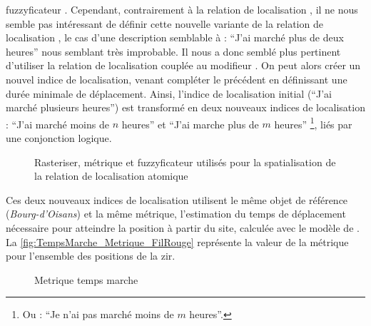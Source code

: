 fuzzyficateur . Cependant, contrairement à la
relation de localisation , il ne
nous semble pas intéressant de définir cette nouvelle variante de la
relation de localisation , le cas
d'une description semblable à : \enquote{J'ai marché plus de deux
  heures} nous semblant très improbable. Il nous a donc semblé plus
pertinent d'utiliser la relation de localisation
 couplée au modifieur
. On peut alors créer un nouvel indice de
localisation, venant compléter le précédent en définissant une durée
minimale de déplacement. Ainsi, l'indice de localisation initial
(\enquote{J'ai marché plusieurs heures}) est transformé en deux
nouveaux indices de localisation : \enquote{J'ai marché moins de \(n\)
  heures} et \enquote{J'ai marche plus de \(m\) heures} \footnote{Ou :
  \enquote{Je n'ai pas marché moins de \(m\) heures}.}, liés par une
conjonction logique.

\begin{figure}
  \centering
  
  \caption{Rasteriser, métrique et fuzzyficateur utilisés pour la
    spatialisation de la relation de localisation atomique
    \protect{}}
  \label{fig:ex_parties_statialisation_ATempsDeMarcheDe}
\end{figure}

Ces deux nouveaux indices de localisation utilisent le même objet de
référence (\ie \emph{Bourg-d'Oisans}) et la même métrique,
l'estimation du temps de déplacement nécessaire pour atteindre la
position à partir du site, calculée avec le modèle de
\textcite{Tobler1993}. La \autoref{fig:TempsMarche_Metrique_FilRouge}
représente la valeur de la métrique pour l'ensemble des positions de
la \ac{zir}.

\begin{figure}
  \centering
  
  \caption{Metrique temps marche}
  \label{fig:TempsMarche_Metrique_FilRouge}
\end{figure}

